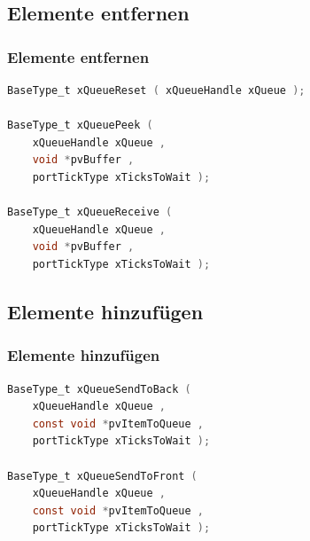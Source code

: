 \documentclass{beamer}
\begin{document}
	\subsection{Elemente entfernen}
\begin{frame}[fragile]
\frametitle{Elemente entfernen}
\begin{lstlisting}[language = C]
BaseType_t xQueueReset ( xQueueHandle xQueue );

BaseType_t xQueuePeek (
	xQueueHandle xQueue ,
	void *pvBuffer ,
	portTickType xTicksToWait );
	
BaseType_t xQueueReceive (
	xQueueHandle xQueue ,
	void *pvBuffer ,
	portTickType xTicksToWait );
\end{lstlisting}
\end{frame}

	\subsection{Elemente hinzufügen}
\begin{frame}[fragile]
\frametitle{Elemente hinzufügen}
\begin{lstlisting}[language = C]
BaseType_t xQueueSendToBack (
	xQueueHandle xQueue ,
	const void *pvItemToQueue ,
	portTickType xTicksToWait );
	
BaseType_t xQueueSendToFront (
	xQueueHandle xQueue ,
	const void *pvItemToQueue ,
	portTickType xTicksToWait );
\end{lstlisting}
\end{frame}
\end{document}
